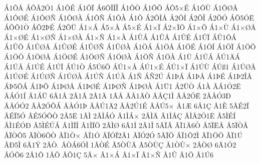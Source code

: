 {^^c11^^d4^^c5
^^c1^^d4^^c52^^d31
^^c11^^d4^^c9
^^c11^^d4^^cf
^^c16^^d4^^cf^^cd^^ce
^^c11^^d4^^d2
^^c11^^d4^^d5
^^c1^^d45^^d7^^c9
^^c11^^d4^^d9
^^c11^^d4^^d8^^c5
^^c11^^d4^^d8^^c9
^^c11^^d4^^d8^^d1
^^c11^^d4^^d8^^c0
^^c11^^d4^^d1
^^c11^^d4^^c0
^^c11^^d5
^^c12^^d5^^cc^^c5
^^c12^^d5^^cd
^^c12^^d5^^ce
^^c12^^d5^^d3
^^c1^^d55^^d3^^cb
^^c1^^d5^^d41^^d2
^^c1^^d52^^de^^c9
^^c12^^d5^^dc
^^c11^^d7^^c1
^^c15^^d7^^c5
^^c15^^d7^^c9
^^c11^^d7^^cf
^^c12^^d7^^cf^^d4
^^c11^^d7^^d5
^^c11^^d7^^d9
^^c11^^d7^^d8^^c5
^^c11^^d7^^d8^^c9
^^c11^^d7^^d8^^d1
^^c11^^d7^^d8^^c0
^^c11^^d7^^d1
^^c11^^d7^^c0
^^c11^^db^^c1
^^c11^^db^^c5
^^c11^^db^^c9
^^c11^^db^^cf
^^c1^^db1^^d4^^c1
^^c11^^db^^d5
^^c11^^db^^d8^^c5
^^c11^^db^^d8^^c9
^^c11^^db^^d8^^d1
^^c11^^db^^d8^^c0
^^c11^^d6^^c1
^^c11^^d6^^c5
^^c11^^d6^^c9
^^c11^^d6^^cd
^^c11^^d6^^cf
^^c11^^d6^^d5
^^c11^^d6^^d6
^^c11^^d6^^d8^^c5
^^c11^^d6^^d8^^c9
^^c11^^d6^^d8^^d1
^^c11^^d6^^d8^^c0
^^c11^^d6^^d1
^^c11^^d6^^c0
^^c11^^d9
^^c11^^da^^c1
^^c1^^da1^^c4^^c1
^^c11^^da^^c5
^^c11^^da^^c9
^^c11^^da^^cf
^^c1^^da1^^d2
^^c15^^da6^^d5
^^c1^^da1^^d7^^c5
^^c1^^da1^^d7^^c9
^^c1^^da1^^d7^^cf
^^c11^^da^^d9
^^c1^^da^^df1
^^c11^^da^^d8^^c5
^^c11^^da^^d8^^c9
^^c11^^da^^d8^^d1
^^c11^^da^^d8^^c0
^^c11^^da^^d1
^^c11^^da^^c0
^^c11^^d1
^^c1^^d12^^da
^^c11^^de^^c1
^^c11^^de^^c5
^^c11^^de^^c9
^^c11^^de2^^ce^^c5
^^c1^^de5^^d4^^c1
^^c11^^de^^d5
^^c11^^de^^d8^^c5
^^c11^^de^^d8^^c9
^^c11^^de^^d8^^d1
^^c11^^de^^d8^^c0
^^c11^^dc1
^^c12^^dc^^d2
^^c11^^c0
^^c2^^c11^^d32^^cb
^^c2^^c1^^d31^^cd
^^c21^^c1^^dc
6^^c21^^c2
2^^c21^^c3
2^^c21^^c4
1^^c2^^c5
^^c2^^c51^^c4^^d2
^^c2^^c5^^c71^^cc
^^c2^^c52^^d3^^cb
2^^c2^^c5^^d33^^d0
^^c2^^c5^^d3^^d32
^^c2^^c52^^d3^^d4^^c1
^^c2^^c5^^d31^^de
^^c2^^c5^^da1^^c42
^^c2^^c52^^da1^^c9
^^c2^^c5^^da5^^d7
^^c21^^c6
6^^c21^^c7
^^c21^^c8
5^^c2^^c92^^cf
^^c2^^c9^^cf5^^d3
^^c2^^c95^^d3^^d4^^d2
2^^c25^^cb
1^^c2^^cc
2^^c2^^cc^^c1^^d3
^^c21^^cc^^c1^^d7
2^^c2^^cc^^c4
^^c21^^cc^^c5^^c7
^^c2^^cc^^c52^^d31^^cb
^^c25^^cc^^c9^^cd
^^c2^^cc1^^c9^^d3^^d0
^^c25^^cc^^c9^^da^^c1
^^c21^^cc^^cf^^cd
^^c21^^cc^^cf^^d6
2^^c2^^cc^^d8
6^^c21^^cd
2^^c21^^ce
5^^c2^^cf^^c3
^^c2^^cf1^^c46^^d2
^^c25^^cf^^cb^^c5
^^c25^^cf^^d2^^c2
^^c2^^cf^^d2^^d45
^^c2^^cf^^d26^^d4^^d2
^^c2^^cf1^^d2^^d7
^^c2^^cf1^^d3
^^c2^^cf^^d3^^cf2^^c21
^^c2^^cf^^d32^^d3
5^^c2^^cf^^d4
^^c2^^cf1^^d42^^cc
^^c2^^cf1^^d6^^d6
^^c2^^cf1^^da
^^c2^^d05^^cc
6^^c21^^dd
2^^c2^^d2.
^^c2^^d2^^c16^^d3^^cc
1^^c2^^d2^^c9
^^c25^^d2^^d9^^c4
^^c25^^d2^^d9^^c7
^^c21^^d2^^d9^^d7
2^^c2^^d2^^d8
6^^c21^^d32
^^c2^^d3^^d46
2^^c21^^d4
1^^c2^^d5
^^c2^^d51^^c7
5^^c2^^d7
^^c21^^d7^^c1
^^c21^^d7^^cf
^^c21^^d7^^d1
^^c21^^db
^^c21^^d6
^^c21^^da6
}
